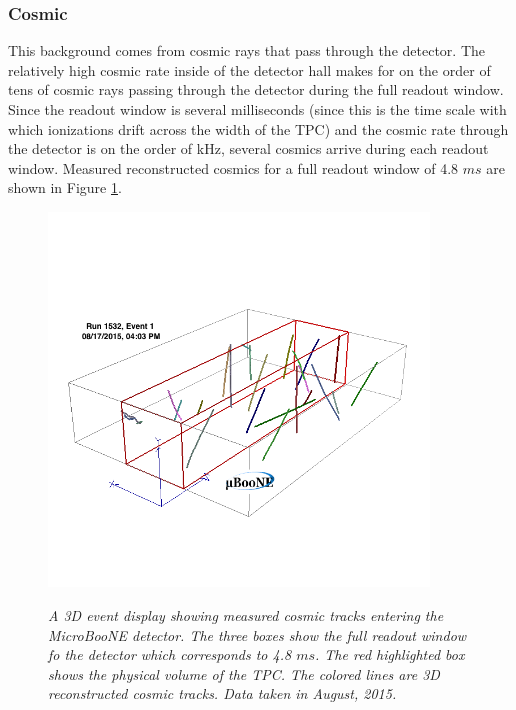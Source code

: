 \subsubsection{Cosmic}
This background comes from cosmic rays that pass through the detector. The relatively high cosmic rate inside of the detector hall makes for on the order of tens of cosmic rays passing through the detector during the full readout window. Since the readout window is several milliseconds (since this is the time scale with which ionizations drift across the width of the TPC) and the cosmic rate through the detector is on the order of kHz, several cosmics arrive during each readout window. Measured reconstructed cosmics for a full readout window of 4.8 $ms$ are shown in Figure \ref{UB_publicplot_3dcosmics}.\\


\begin{figure}[ht!]
\centering
\includegraphics[width=0.9\textwidth]{Figures/UB_publicplot_3dcosmics.png}\\
\caption{\textit{A 3D event display showing measured cosmic tracks entering the MicroBooNE detector. The three boxes show the full readout window fo the detector which corresponds to 4.8 $ms$. The red highlighted box shows the physical volume of the TPC. The colored lines are 3D reconstructed cosmic tracks. Data taken in August, 2015.}}
\label{UB_publicplot_3dcosmics}
\end{figure}


